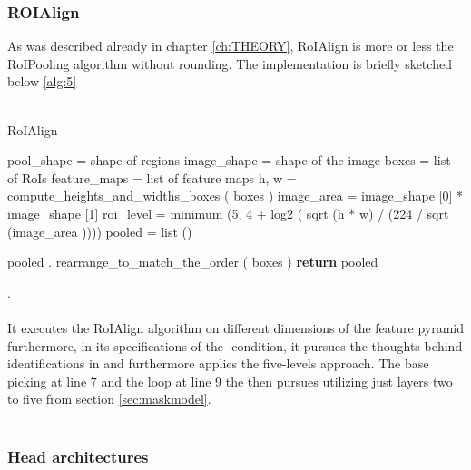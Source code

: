  \subsubsection{ROIAlign}

As was described already in chapter \ref{ch:THEORY}, RoIAlign is more or less the RoIPooling algorithm without rounding. The implementation is briefly sketched below \ref{alg:5}
\\
\\
\begin{algorithm}[H] \label{alg:5}
  \caption{RoIAlign}
  \SetAlgoLined
  \DontPrintSemicolon
pool\_shape = shape of regions\;
 image\_shape = shape of the image\;
 boxes = list of RoIs\;
 feature\_maps = list of feature maps\;
 h, w = compute\_heights\_and\_widths\_boxes ( boxes )\;
 image\_area = image\_shape [0] * image\_shape [1]\;
 roi\_level = minimum (5, 4 + log2 ( sqrt (h * w) / (224 / sqrt (image\_area ))))\;
pooled = list ()\;

pooled . rearrange\_to\_match\_the\_order ( boxes )\;
\textbf{return} pooled\;
\end{algorithm}
.\\
\\
It executes the RoIAlign algorithm on different dimensions of the feature pyramid furthermore, in its specifications of the   $\newcommand*{\logten}{\mathop{\log_{2}}}$ condition, it pursues the thoughts behind identifications in \cite{K} and furthermore applies the five-levels approach. The base picking at line 7 and the loop at line 9 the then pursues utilizing just layers two to five from section \ref{sec:maskmodel}.
\\
\\
\subsubsection{Head architectures}

